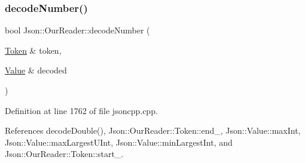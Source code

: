 \subsubsection{\texorpdfstring{decode\+Number()}{decodeNumber()}\hspace{0.1cm}{\footnotesize\ttfamily [2/2]}}
{\footnotesize\ttfamily bool Json\+::\+Our\+Reader\+::decode\+Number (\begin{DoxyParamCaption}\item[{\hyperlink{class_json_1_1_our_reader_1_1_token}{Token} \&}]{token,  }\item[{\hyperlink{class_json_1_1_value}{Value} \&}]{decoded }\end{DoxyParamCaption})\hspace{0.3cm}{\ttfamily [private]}}



Definition at line 1762 of file jsoncpp.\+cpp.



References decode\+Double(), Json\+::\+Our\+Reader\+::\+Token\+::end\+\_\+, Json\+::\+Value\+::max\+Int, Json\+::\+Value\+::max\+Largest\+U\+Int, Json\+::\+Value\+::min\+Largest\+Int, and Json\+::\+Our\+Reader\+::\+Token\+::start\+\_\+.


